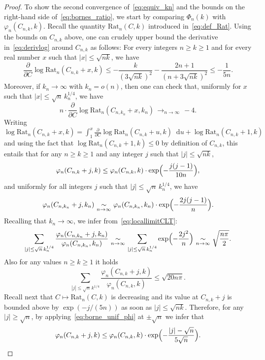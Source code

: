 \documentclass[11pt]{article}
\theoremstyle{plain}
\theoremstyle{definition}
\theoremstyle{remark}
\renewcommand{\d}{\mathop{}\!\mathrm{d}}
\newcommand{\cv}[1][n]{\,\mathop{\longrightarrow}^{}_{#1 \to \infty}\,}
\newcommand{\equi}[1][n]{\,\mathop{\sim}^{}_{#1 \to \infty}\,}
\begin{document}
\begin{proof}
To show the second convergence of~\eqref{eq:equiv_kn} and the bounds on the right-hand side of~\eqref{eq:bornes_ratio}, we start by comparing $\Phi_n(k)$ with $\varphi_{n}(C_{n,k},k)$.
Recall the quantity $\mathrm{Rat}_{n}(C,k)$ introduced in~\eqref{eq:def_Rat}.
Using the bounds on $C_{n,k}$ above, one can crudely upper bound the derivative in~\eqref{eq:derivlog} around $C_{n,k}$ as follows: For every integers $n \ge k \ge 1$ and for every real number $x$ such that $|x| \le \sqrt{nk}$, we have
\[
\frac{\partial}{\partial C} \log \mathrm{Rat}_n(C_{n,k}+x,k)
\le - \frac{k}{(3\sqrt{nk})^2}- \frac{2n+1}{(n+3\sqrt{nk})^2}
\le - \frac{1}{5n}.
\]
Moreover, if $k_n \to\infty$ with $k_n = o(n)$, then
one can check that, uniformly for $x$ such that $|x| \leq \sqrt{n}\, k_{n}^{1/4}$, we have
\[
n \cdot \frac{\partial}{\partial C} \log \mathrm{Rat}_n(C_{n,k_{n}}+x,k_{n}) \cv -4.
\]
Writing $ \log \mathrm{Rat}_n(C_{n,k}+x,k) = \int_{1}^{x} \frac{\partial}{\partial C} \log \mathrm{Rat}_n(C_{n,k}+u,k) \d u+\log \mathrm{Rat}_n(C_{n,k}+1,k)$ and using the fact that $\log \mathrm{Rat}_n(C_{n,k}+1,k) \leq 0$ by definition of $C_{n,k}$,
this entails that for any $n \ge k \ge 1$ and any integer $j$ such that $|j| \le \sqrt{nk}$,
\begin{equation} \label{eq:borne_unif_phi}
\varphi_{n}(C_{n,k}+j,k) \le \varphi_{n}(C_{n,k},k) \cdot \exp\Bigl(- \frac{j(j-1)}{10n}\Bigr),
\end{equation}
and uniformly for all integers $j$ such that $|j| \leq \sqrt{n}\, k_{n}^{1/4}$, we have
\begin{equation}\label{eq:locallimitCLT}
\varphi_{n}(C_{n,k_{n}}+j,k_{n}) \equi \varphi_{n}(C_{n,k_{n}},k_{n}) \cdot \exp\Bigl(-\frac{2j(j-1)}{n}\Bigr).
\end{equation}
Recalling that $k_{n} \to \infty$, we infer from~\eqref{eq:locallimitCLT}:
\[
\sum_{|j| \leq \sqrt{n}\,k_{n}^{1/4}} \frac{\varphi_{n}(C_{n,k_{n}}+j,k_{n})}{\varphi_{n}(C_{n,k_{n}},k_{n})}
\equi \sum_{|j| \leq \sqrt{n}\,k_{n}^{1/4}} \exp\Bigl(- \frac{2j^2}{n}\Bigr)
\equi \sqrt{\frac{n \pi}{2}}.
\]
Also for any values $n \ge k \ge 1$ it holds
\[
\sum_{|j| \leq \sqrt{n}\,k^{1/4}} \frac{\varphi_{n}(C_{n,k}+j,k)}{\varphi_{n}(C_{n,k},k)}
\le \sqrt{20 n \pi}.
\]
Recall next that $ C \mapsto \mathrm{Rat}_n(C,k)$ is decreasing and its value at $C_{n,k}+j$ is bounded above by $\exp(-j/(5n))$ as soon as $|j| \le \sqrt{nk}$. Therefore, for any $|j| \ge\sqrt{n}$, by applying~\eqref{eq:borne_unif_phi} at $\pm\sqrt{n}$ we infer that
\[
\varphi_{n}(C_{n,k}+j,k) \le \varphi_{n}(C_{n,k},k) \cdot \exp\Bigl(- \frac{|j|-\sqrt{n}}{5\sqrt{n}}\Bigr).
\]
\end{proof}
\end{document}
